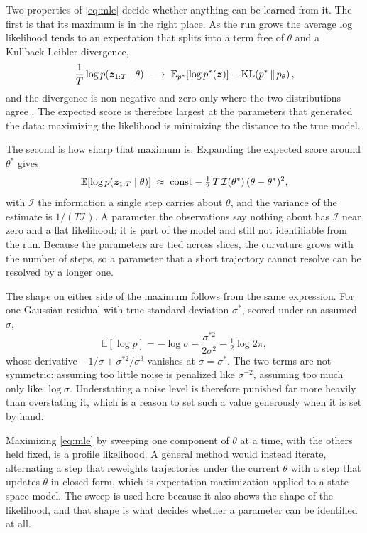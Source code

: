 Two properties of \eqref{eq:mle} decide whether anything can be learned from it. The first is that its maximum
is in the right place. As the run grows the average log likelihood tends to an expectation that splits into a term
free of $\theta$ and a Kullback-Leibler divergence,
\begin{equation}
  \frac{1}{T} \log p(\bm{z}_{1:T} \mid \theta) \;\longrightarrow\;
  \mathbb{E}_{p^*}\!\left[\log p^*(\bm{z})\right] - \mathrm{KL}\!\left(p^* \,\|\, p_{\theta}\right),
  \label{eq:kl}
\end{equation}
and the divergence is non-negative and zero only where the two distributions agree
\cite[ch.~17]{koller2009probabilistic}. The expected score is therefore largest at the parameters that generated
the data: maximizing the likelihood is minimizing the distance to the true model.

The second is how sharp that maximum is. Expanding the expected score around $\theta^*$ gives
\begin{equation}
  \mathbb{E}\!\left[\log p(\bm{z}_{1:T} \mid \theta)\right] \;\approx\; \text{const}
  - \tfrac{1}{2}\, T\, \mathcal{I}(\theta^*)\, (\theta - \theta^*)^2,
  \label{eq:fisher}
\end{equation}
with $\mathcal{I}$ the information a single step carries about $\theta$, and the variance of the estimate is
$1/(T \mathcal{I})$. A parameter the observations say nothing about has $\mathcal{I}$ near zero and a flat
likelihood: it is part of the model and still not identifiable from the run. Because the parameters are tied
across slices, the curvature grows with the number of steps, so a parameter that a short trajectory cannot
resolve can be resolved by a longer one.

The shape on either side of the maximum follows from the same expression. For one Gaussian residual with true
standard deviation $\sigma^*$, scored under an assumed $\sigma$,
\begin{equation}
  \mathbb{E}\!\left[\log p\right] = -\log \sigma - \frac{\sigma^{*2}}{2 \sigma^{2}} - \tfrac{1}{2} \log 2\pi,
  \label{eq:gaussian-score}
\end{equation}
whose derivative $-1/\sigma + \sigma^{*2}/\sigma^{3}$ vanishes at $\sigma = \sigma^*$. The two terms are not
symmetric: assuming too little noise is penalized like $\sigma^{-2}$, assuming too much only like $\log \sigma$.
Understating a noise level is therefore punished far more heavily than overstating it, which is a reason to set
such a value generously when it is set by hand.

Maximizing \eqref{eq:mle} by sweeping one component of $\theta$ at a time, with the others held fixed, is a profile
likelihood. A general method would instead iterate, alternating a step that reweights trajectories under the current
$\theta$ with a step that updates $\theta$ in closed form, which is expectation maximization
\cite[ch.~19]{koller2009probabilistic} applied to a state-space model. The sweep is used here because it also shows
the shape of the likelihood, and that shape is what decides whether a parameter can be identified at all.
